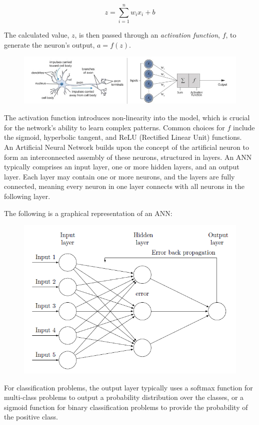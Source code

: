 \[
z = \sum_{i=1}^{n} w_i x_i + b 
\]

The calculated value, $ z $, is then passed through an \textit{activation function}, $ f $, to generate the neuron's output, $ a = f(z) $.

\begin{figure}[h!]
	\centering
	\includegraphics[width=0.8\linewidth]{Images/nn_neuron}
	\caption{}
	\label{fig:nn_neuron}
\end{figure}

The activation function introduces non-linearity into the model, which is crucial for the network's ability to learn complex patterns. Common choices for $ f $ include the sigmoid, hyperbolic tangent, and ReLU (Rectified Linear Unit) functions.\\

An Artificial Neural Network builds upon the concept of the artificial neuron to form an interconnected assembly of these neurons, structured in layers. An ANN typically comprises an input layer, one or more hidden layers, and an output layer. Each layer may contain one or more neurons, and the layers are fully connected, meaning every neuron in one layer connects with all neurons in the following layer.

The following is a graphical representation of an ANN:
\begin{figure}[h!]
	\centering
	\includegraphics[width=0.5\linewidth]{Images/fig_neural_network}
	\caption{}
	\label{fig:Fig_nn}
\end{figure}


For classification problems, the output layer typically uses a softmax function for multi-class problems to output a probability distribution over the classes, or a sigmoid function for binary classification problems to provide the probability of the positive class.

